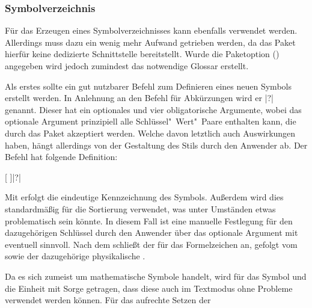 \documentclass[%
  english,ngerman,%
  cdgeometry=no,DIV=12,%
  cd=false,cdfont=false,cdtitle=true,%
  headings=normal,%
  automark,%
  listof=toc,%
]{tudscrartcl}
\begin{document}
\subsubsection{Symbolverzeichnis}
Für das Erzeugen eines Symbolverzeichnisses kann ebenfalls  
verwendet werden. Allerdings muss dazu ein wenig mehr Aufwand getrieben werden, 
da das Paket hierfür keine dedizierte Schnittstelle bereitstellt. Wurde die 
Paketoption () angegeben wird jedoch 
zumindest das notwendige Glossar erstellt.

Als erstes sollte ein gut nutzbarer Befehl zum Definieren eines neuen Symbols 
erstellt werden. In Anlehnung an den Befehl für Abkürzungen  
wird er |?| genannt. Dieser hat ein optionales und vier 
obligatorische Argumente, wobei das optionale Argument prinzipiell alle 
Schlüssel"~Wert"~Paare enthalten kann, die durch das Paket  
akzeptiert werden. Welche davon letztlich auch Auswirkungen haben, hängt 
allerdings von der Gestaltung des Stils durch den Anwender ab. Der Befehl hat 
folgende Definition:
%
\begin{quoting}[leftmargin=\parindent]
[%
  \LParameter{}%
]|?|%
\end{quoting}
%
Mit  erfolgt die eindeutige Kennzeichnung des Symbols. Außerdem 
wird dies standardmäßig für die Sortierung verwendet, was unter Umständen etwas
problematisch sein könnte. In diesem Fall ist eine manuelle Festlegung für den 
dazugehörigen Schlüssel durch den Anwender über das optionale Argument mit 
 eventuell sinnvoll. Nach dem  
schließt der  für das Formelzeichen an, gefolgt vom  
sowie der dazugehörige physikalische .
%
\CodeHook{\let\newcommand\renewcommand}
\begin{Preamble*}
\newcommand*{\newformulasymbol}[5][]{%
  \newglossaryentry{#2}{%
    type=symbols,%
    name={#3},%
    description={\nopostdesc},%
    symbol={\ensuremath{#4}},%
    user1={\ensuremath{\mathrm{#5}}},%
    sort={#2},%
    #1%
  }%
}

\end{Preamble*}
%
Da es sich zumeist um mathematische Symbole handelt, wird für das Symbol und 
die Einheit mit  Sorge getragen, dass diese auch im 
Textmodus ohne Probleme verwendet werden können. Für das aufrechte Setzen der 
\end{document}
